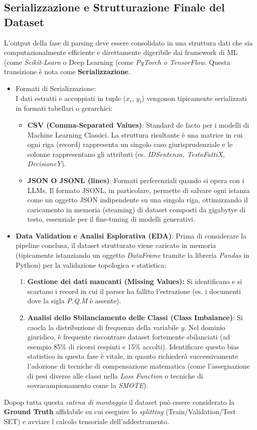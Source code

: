\documentclass{article}
\begin{document}
\subsection{Serializzazione e Strutturazione Finale del Dataset}
L'output della fase di parsing deve essere consolidato in una struttura dati che sia computazionalmente efficiente e direttamente digeribile dai framework di ML (come \textit{Scikit-Learn} o Deep Learning (come \textit{PyTorch o TensorFlow}. Questa transizione è nota come \textbf{Serializzazione}.
\begin{itemize}
    \item Formati di Serializzazione:\\
    I dati estratti e accoppiati in tuple ($x_i$, $y_i$) vengonon tipicamente serializzati in formati tabellari o gerarchici:
    \begin{itemize}
         \item \textbf{CSV (Comma-Separated Values)}: Standard de facto per i modelli di Machine Learning Classici. La struttura risultante è una matrice in cui ogni riga (record) rappresenta un singolo caso giurisprudenziale e le colonne rappresentano gli attributi (es. \textit{IDSentenza, TestoFattiX, DecisioneY}).

        \item \textbf{JSON O JSONL (lines)}: Formati preferenziali quando si opera con i LLMs. Il formato JSONL, in particolare, permette di salvare ogni istanza come un oggetto JSON indipendente su una singola riga, ottimizzando il caricamento in memoria (steaming) di dataset composti da gigabytye di testo, essenziale per il fine-tuning di modelli generativi.
    \end{itemize}
\item \textbf{Data Validation e Analisi Esplorativa (EDA)}: Prima di considerare la pipeline conclusa, il dataset strutturato viene caricato in memoria (tipicamente istanziando un oggetto \textit{DataFrame} tramite la libreria \textit{Pandas} in Python) per la validazione topologica e statistica:
\begin{enumerate}
    \item \textbf{Gestione dei dati mancanti (Missing Values):} Si identificano e si scartano i record in cui il parser ha fallito l'estrazione (es. i documenti dove la sigla \textit{P.Q.M} è assente).

    \item \textbf{Analisi dello Sbilanciamento delle Classi (Class Imbalance)}: Si caocla la distribuzione di frequenza della variabile $y$. Nel dominio giuridico, è frequente riscontrare dataset fortemente sbilanciati (ad esempio 85\% di ricorsi respinti e 15\% accolti). Identificare questo bias statistico in questa fase è vitale, in quanto richiederà successivamente l'adozione di tecniche di compensazione matematica (come l'assegnazione di pesi diverse alle classi nella \textit{Loss Function} o tecniche di sovracampionamento come la \textit{SMOTE}).
\end{enumerate}
\end{itemize}
Dopop tutta questa \textit{catena di montaggio} il dataset può essere considerato la \textbf{Ground Truth} affidabile su cui eseguire lo \textit{splitting} (Train/Validation/Test SET) e avviare l calcolo tensoriale dell'addestramento.
\end{document}
